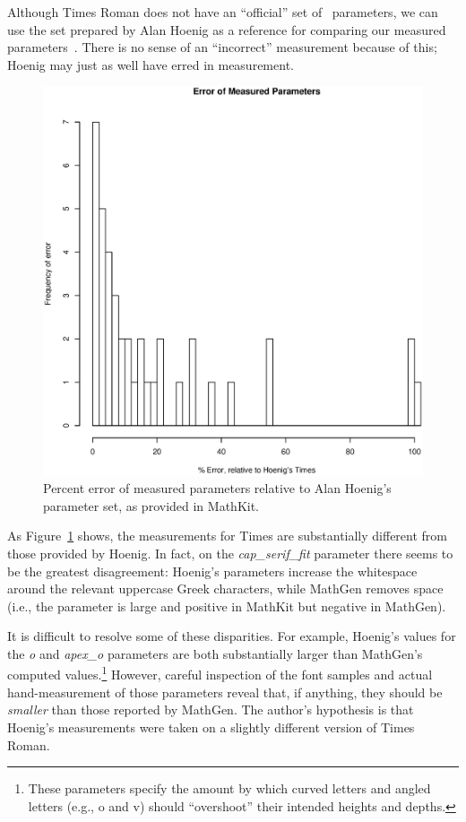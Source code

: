 
Although Times Roman does not have an ``official'' set of \MF\ parameters, we
can use the set prepared by Alan Hoenig as a reference for comparing our
measured parameters~\cite{mathkit}. There is no sense of an ``incorrect''
measurement because of this; Hoenig may just as well have erred in measurement.

\begin{figure}
\begin{center}
\includegraphics[width=6in]{params/times}
\end{center}
\caption{Percent error of measured parameters relative to Alan Hoenig's
parameter set, as provided in MathKit.}
\label{f:times}
\end{figure}

As Figure~\ref{f:times} shows, the measurements for Times are substantially
different from those provided by Hoenig. In fact, on the \emph{cap\_serif\_fit}
parameter there seems to be the greatest disagreement: Hoenig's parameters
increase the whitespace around the relevant uppercase Greek characters, while
MathGen removes space (i.e., the parameter is large and positive in MathKit but
negative in MathGen).

It is difficult to resolve some of these disparities. For example, Hoenig's
values for the \emph{o} and \emph{apex\_o} parameters are both substantially
larger than MathGen's computed values.\footnote{These parameters specify the
amount by which curved letters and angled letters (e.g., o and v) should
``overshoot'' their intended heights and depths.} However, careful inspection of
the font samples and actual hand-measurement of those parameters reveal that, if
anything, they should be \emph{smaller} than those reported by MathGen. The
author's hypothesis is that Hoenig's measurements were taken on a slightly
different version of Times Roman.
